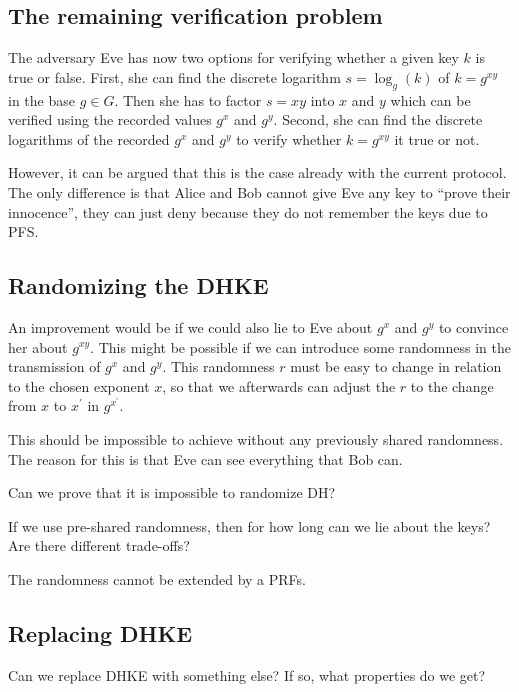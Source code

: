 \subsection{The remaining verification problem}

The adversary Eve has now two options for verifying whether a given key \(k\) 
is true or false.
First, she can find the discrete logarithm \(s = \log_g( k )\) of \(k 
= g^{xy}\) in the base \(g\in G\).
Then she has to factor \(s = xy\) into \(x\) and \(y\) which can be verified 
using the recorded values \(g^x\) and \(g^y\).
Second, she can find the discrete logarithms of the recorded \(g^x\) and 
\(g^y\) to verify whether \(k = g^{xy}\) it true or not.

However, it can be argued that this is the case already with the current 
protocol.
The only difference is that Alice and Bob cannot give Eve any key to 
\enquote{prove their innocence}, they can just deny because they do not 
remember the keys due to \ac{PFS}.

\subsection{Randomizing the \acs{DHKE}}\label{sec:random}

An improvement would be if we could also lie to Eve about \(g^x\) and \(g^y\) 
to convince her about \(g^{xy}\).
This might be possible if we can introduce some randomness in the transmission 
of \(g^x\) and \(g^y\).
This randomness \(r\) must be easy to change in relation to the chosen exponent 
\(x\), so that we afterwards can adjust the \(r\) to the change from \(x\) to 
\(x^\prime\) in \(g^{x^\prime}\).

This should be impossible to achieve without any previously shared randomness.
The reason for this is that Eve can see everything that Bob can.

Can we prove that it is impossible to randomize \ac{DH}?

If we use pre-shared randomness, then for how long can we lie about the keys?
Are there different trade-offs?

The randomness cannot be extended by a \acp{PRF}.

\subsection{Replacing \acs{DHKE}}

Can we replace \ac{DHKE} with something else?
If so, what properties do we get?


